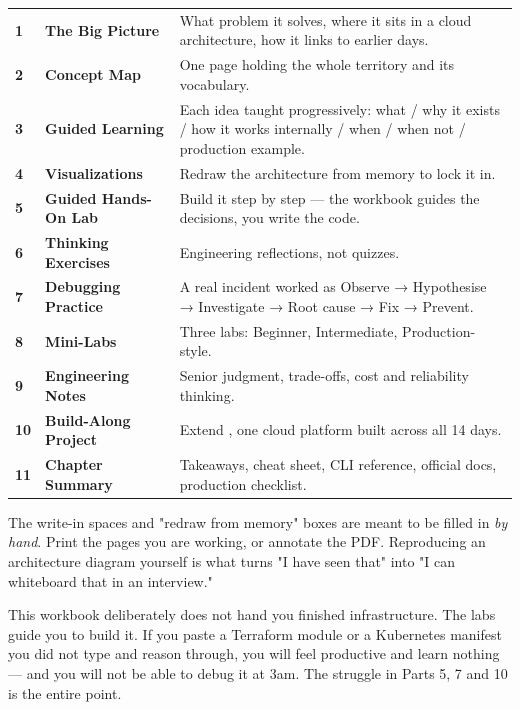 \begin{center}\small
\begin{tabularx}{\linewidth}{@{}p{4mm}L{38mm}X@{}}
\textbf{1} & \textbf{The Big Picture} & What problem it solves, where it sits in a cloud architecture, how it links to earlier days.\\[1.2mm]
\textbf{2} & \textbf{Concept Map} & One page holding the whole territory and its vocabulary.\\[1.2mm]
\textbf{3} & \textbf{Guided Learning} & Each idea taught progressively: what / why it exists / how it works internally / when / when not / production example.\\[1.2mm]
\textbf{4} & \textbf{Visualizations} & Redraw the architecture from memory to lock it in.\\[1.2mm]
\textbf{5} & \textbf{Guided Hands-On Lab} & Build it step by step --- the workbook guides the decisions, you write the code.\\[1.2mm]
\textbf{6} & \textbf{Thinking Exercises} & Engineering reflections, not quizzes.\\[1.2mm]
\textbf{7} & \textbf{Debugging Practice} & A real incident worked as Observe → Hypothesise → Investigate → Root cause → Fix → Prevent.\\[1.2mm]
\textbf{8} & \textbf{Mini-Labs} & Three labs: Beginner, Intermediate, Production-style.\\[1.2mm]
\textbf{9} & \textbf{Engineering Notes} & Senior judgment, trade-offs, cost and reliability thinking.\\[1.2mm]
\textbf{10} & \textbf{Build-Along Project} & Extend , one cloud platform built across all 14 days.\\[1.2mm]
\textbf{11} & \textbf{Chapter Summary} & Takeaways, cheat sheet, CLI reference, official docs, production checklist.\\
\end{tabularx}
\end{center}

\begin{prodtip}
The write-in spaces and "redraw from memory" boxes are meant to be filled in \emph{by hand}. Print the pages
you are working, or annotate the PDF. Reproducing an architecture diagram yourself is what turns
"I have seen that" into "I can whiteboard that in an interview."
\end{prodtip}

\begin{secwarn}
This workbook deliberately does not hand you finished infrastructure. The labs guide you to build it. If you
paste a Terraform module or a Kubernetes manifest you did not type and reason through, you will feel
productive and learn nothing --- and you will not be able to debug it at 3am. The struggle in Parts 5, 7 and 10
is the entire point.
\end{secwarn}

